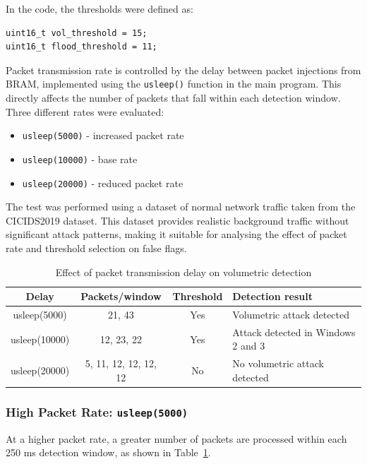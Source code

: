 In the code, the thresholds were defined as:

\begin{verbatim}
uint16_t vol_threshold = 15;
uint16_t flood_threshold = 11;
\end{verbatim}

Packet transmission rate is controlled by the delay between packet injections
from BRAM, implemented using the \texttt{usleep()} function in the main
program. This directly affects the number of packets that fall within each
detection window. Three different rates were evaluated:

\begin{itemize}
    \item \texttt{usleep(5000)} - increased packet rate
    \item \texttt{usleep(10000)} - base rate
    \item \texttt{usleep(20000)} - reduced packet rate
\end{itemize}

The test was performed using a dataset of normal network traffic taken from the
CICIDS2019 dataset. This dataset provides realistic background traffic without
significant attack patterns, making it suitable for analysing the effect of
packet rate and threshold selection on false flags.

\begin{table}[H]
    \centering
    \caption{Effect of packet transmission delay on volumetric detection}
    \begin{tabularx}{\linewidth}{|c|c|c|X|}
        \hline
        \textbf{Delay} & \textbf{Packets/window} & \textbf{Threshold} & \textbf{Detection result}          \\
        \hline
        usleep(5000)   & 21, 43                  & Yes                & Volumetric attack detected         \\
        \hline
        usleep(10000)  & 12, 23, 22              & Yes                & Attack detected in Windows 2 and 3 \\
        \hline
        usleep(20000)  & 5, 11, 12, 12, 12, 12   & No                 & No volumetric attack detected      \\
        \hline
    \end{tabularx}
    \label{tab:packet_rate_results}
\end{table}

\subsubsection{High Packet Rate: \texttt{usleep(5000)}}
At a higher packet rate, a greater number of packets are processed within each
250 ms detection window, as shown in Table~\ref{tab:packet_rate_results}.


